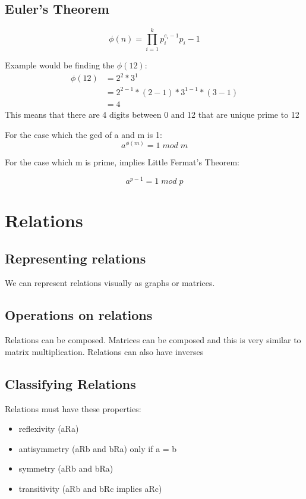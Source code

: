 \documentclass[twoside]{article}
\begin{document}
\subsection{Euler's Theorem}

\begin{equation}
\phi (n) =  \prod_{i=1}^k p_i^{e_i -1} p_i -1
\end{equation}

Example would be finding the $\phi(12)$: 
\begin{align}
\phi(12) &= 2^2 * 3 ^ 1\\
&= 2^{2-1} * (2-1) * 3^{1-1} * (3 - 1)\\
&= 4
\end{align}
This means that there are 4 digits between 0 and 12 that are unique prime to 12
 
For the case which the gcd of a and m is 1:
\begin{equation}
a^{\phi(m)} = 1 \; mod \; m
\end{equation}


For the case which m is prime, implies Little Fermat's Theorem:

\begin{equation}
a^{p - 1} = 1 \; mod \; p
\end{equation}

\section{Relations}

\subsection{Representing relations}

We can represent relations visually as graphs or matrices.

\subsection{Operations on relations}

Relations can be composed. Matrices can be composed and this is very similar
to matrix multiplication. Relations can also have inverses

\subsection{Classifying Relations}

Relations must have these properties:
\begin{itemize}
\item reflexivity (aRa)
\item antisymmetry (aRb and bRa) only if a = b
\item symmetry (aRb and bRa) 
\item transitivity (aRb and bRc implies aRc)
\end{itemize}
\end{document}
